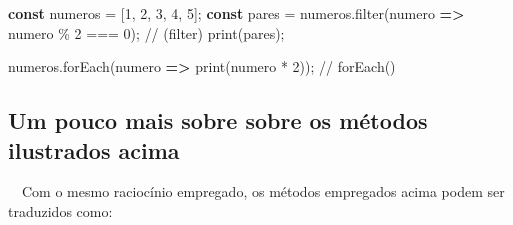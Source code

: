 \documentclass[
  portuguese,
  letterpaper,
  DIV=11,
  numbers=noendperiod]{scrreprt}
\newenvironment{Shaded}{\begin{snugshade}}{\end{snugshade}}
\newcommand{\CommentTok}[1]{\textcolor[rgb]{0.37,0.37,0.37}{#1}}
\newcommand{\DecValTok}[1]{\textcolor[rgb]{0.68,0.00,0.00}{#1}}
\newcommand{\FunctionTok}[1]{\textcolor[rgb]{0.28,0.35,0.67}{#1}}
\newcommand{\KeywordTok}[1]{\textcolor[rgb]{0.00,0.23,0.31}{\textbf{#1}}}
\newcommand{\NormalTok}[1]{\textcolor[rgb]{0.00,0.23,0.31}{#1}}
\newcommand{\OperatorTok}[1]{\textcolor[rgb]{0.37,0.37,0.37}{#1}}
\begin{document}
\begin{Shaded}
\begin{Highlighting}[]
\KeywordTok{const}\NormalTok{ numeros }\OperatorTok{=}\NormalTok{ [}\DecValTok{1}\OperatorTok{,} \DecValTok{2}\OperatorTok{,} \DecValTok{3}\OperatorTok{,} \DecValTok{4}\OperatorTok{,} \DecValTok{5}\NormalTok{]}\OperatorTok{;}
\KeywordTok{const}\NormalTok{ pares }\OperatorTok{=}\NormalTok{ numeros}\OperatorTok{.}\FunctionTok{filter}\NormalTok{(numero }\KeywordTok{=\textgreater{}}\NormalTok{ numero }\OperatorTok{\%} \DecValTok{2} \OperatorTok{===} \DecValTok{0}\NormalTok{)}\OperatorTok{;}  \CommentTok{// (\textasciigrave{}filter\textasciigrave{})}
\FunctionTok{print}\NormalTok{(pares)}\OperatorTok{;}

\NormalTok{numeros}\OperatorTok{.}\FunctionTok{forEach}\NormalTok{(numero }\KeywordTok{=\textgreater{}} \FunctionTok{print}\NormalTok{(numero }\OperatorTok{*} \DecValTok{2}\NormalTok{))}\OperatorTok{;}  \CommentTok{// \textasciigrave{}forEach()\textasciigrave{}}
\end{Highlighting}
\end{Shaded}

\hfill\break

\subsection{Um pouco mais sobre sobre os métodos ilustrados
acima}\label{um-pouco-mais-sobre-sobre-os-muxe9todos-ilustrados-acima}

~~Com o mesmo raciocínio empregado, os métodos empregados acima podem
ser traduzidos como:

\hfill\break
\end{document}

